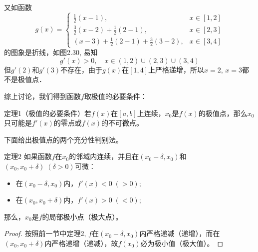 又如函数
\[g(x)=\begin{cases}
    \frac{1}{2}(x-1), & x\in[1,2]\\
    \frac{3}{2}(x-2)+ \frac{1}{2}(2-1), & x\in[2,3]\\
 (x-3) +\frac{1}{2}(2-1) + \frac{3}{2}(3-2), & x\in[3,4]
\end{cases}\]
的图象是折线，如图2.30, 易知
\[g' (x) > 0,\quad x\in (1, 2) \cup (2, 3) \cup (3, 4) \]
但$g'(2)$和$g'(3)$不存在，由于$g(x)$在$[1, 4]$上严格递增，所以$x=2$, $x=3$都不是极值点．

\begin{figure}[htp]
    \centering
{}
    \caption{}
\end{figure}

综上讨论，我们得到函数$f$取极值的必要条件：

\begin{blk}
    {定理1（极值的必要条件）}若$f(x)$在$[a,b]$上连续，$x_0$是$f(x)$的极值点，那么$x_0$只可能是$f'(x)$的零点或$f(x)$的不可微点。
\end{blk}

下面给出极值点的两个充分性判别法。

\begin{blk}
  {定理2} 如果函数$f$在$x_0$的邻域内连续，并且在$(x_0-\delta,x_0)$和$(x_0,x_0+\delta)\; (\delta>0)$可微：
\begin{itemize}
    \item 在$(x_0-\delta,x_0)$内，$f'(x)<0\; (>0)$;
    \item 在$(x_0,x_0+\delta)$内，$f'(x)>0\; (<0)$;
\end{itemize}
那么，$x_0$是$f$的局部极小点（极大点）。
\end{blk}

\begin{proof}
按照前一节中定理2, $f$在$(x_0-\delta,x_0)$内严格递减（递增），而在$(x_0,x_0+\delta)$内严格递增（递减），故$f(x_0)$必为极小值（极大值）。
\end{proof}

